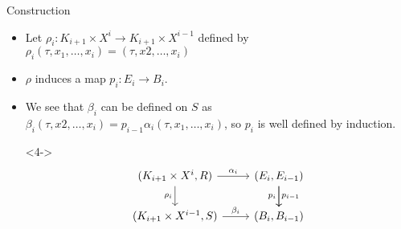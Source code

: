 \documentclass{beamer}
\theoremstyle{definition}
\begin{document}
\begin{frame}[fragile]
\begin{block}{Construction}
\begin{itemize}
\item<1-> Let $\rho_i:K_{i+1}\times X^i\to K_{i+1}\times X^{i-1}$ defined by $\rho_i(\tau,x_1,\dots,x_i)=(\tau,x2,\dots,x_i)$ %
\item<2-> $\rho$ induces a map $p_i:E_i\to B_i$.
\item<3-> We see that $\beta_i$ can be defined on $S$ as $\beta_i(\tau,x2,\dots,x_i)=p_{i-1}\alpha_i(\tau,x_1,\dots,x_i)$, so $p_i$ is well defined by induction. %
\item[]<4->
\[
\begin{tikzcd}
(K_{i+1}\times X^i,R)\arrow[r,"\alpha_i"]\arrow[d,"\rho_i"'] &(E_i,E_{i-1})\arrow[d,"p_{i-1}"]\arrow[d,"p_i"']\\
(K_{i+1}\times X^{i-1},S)\arrow[r, "\beta_i"] & (B_i,B_{i-1})
\end{tikzcd}
\]

\end{itemize}
\end{block}
\end{frame}
\end{document}
